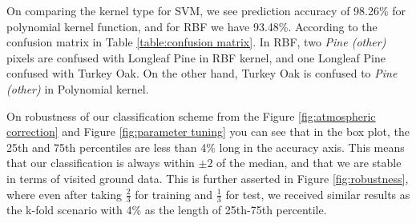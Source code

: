 \documentclass[remotesensing,article,accept,moreauthors,pdftex,12pt,a4paper]{mdpi}
\begin{document}
On comparing the kernel type for SVM, we see prediction accuracy of 98.26\% for polynomial kernel function, and for RBF we have 93.48\%. According to the confusion matrix in Table \ref{table:confusion matrix}. In RBF, two \textit{Pine (other)} pixels are confused with Longleaf Pine in RBF kernel, and one Longleaf Pine confused with Turkey Oak. On the other hand, Turkey Oak is confused to \textit{Pine (other)} in Polynomial kernel.





On robustness of our classification scheme from the Figure \ref{fig:atmospheric correction} and Figure \ref{fig:parameter tuning} you can see that in the box plot, the 25th and 75th percentiles are less than 4\% long in the accuracy axis. This means that our classification is always within $\pm 2$ of the median, and that we are stable in terms of visited ground data. This is further asserted in Figure \ref{fig:robustness}, where even after taking $\frac{2}{3}$ for training and $\frac{1}{3}$ for test, we received similar results as the k-fold scenario with 4\% as the length of 25th-75th percentile. 
\end{document}
